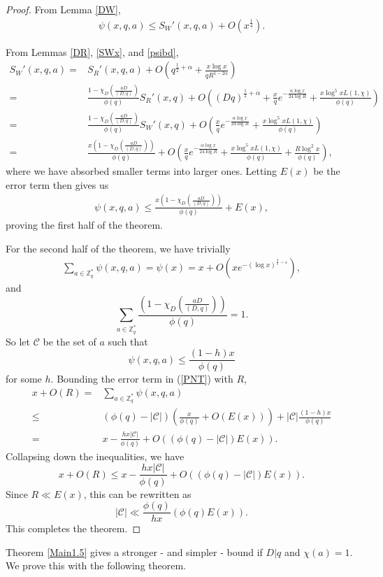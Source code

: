 \documentclass{amsart}
\begin{document}
\begin{proof}
From Lemma \ref{DW},
\begin{align*}
\psi(x,q,a)\leq S_W'(x,q,a)+O\left(x^\frac 14\right).
\end{align*}

From Lemmas \ref{DR}, \ref{SWx}, and \ref{psibd},
\begin{align*}
S_W'(x,q,a)=&S_R'(x,q,a)+O\left(q^{\frac 12+\alpha}+\frac{x\log x}{qR^{1-2\alpha}}\right)\\
=&\frac{1-\chi_D\left(\frac{aD}{(D,q)}\right)}{\phi(q)}S_R'(x,q)+O\left((Dq)^{\frac 12+\alpha}+\frac xqe^{-\frac{\alpha\log x}{24\log R}}+\frac{x\log^5 xL(1,\chi)}{\phi(q)}\right)\\
=&\frac{1-\chi_D\left(\frac{aD}{(D,q)}\right)}{\phi(q)}S_W'(x,q)+O\left(\frac xqe^{-\frac{\alpha\log x}{24\log R}}+\frac{x\log^5 xL(1,\chi)}{\phi(q)}\right)\\
=&\frac{x\left(1-\chi_D\left(\frac{aD}{(D,q)}\right)\right)}{\phi(q)}+O\left(\frac xqe^{-\frac{\alpha\log x}{24\log R}}+\frac{x\log^5 xL(1,\chi)}{\phi(q)}+\frac{R\log^2 x}{\phi(q)}\right),
\end{align*}
where we have absorbed smaller terms into larger ones.  Letting $E(x)$ be the error term then gives us
\begin{gather}\label{psibd1} \psi(x,q,a)\leq \frac{x\left(1-\chi_D\left(\frac{aD}{(D,q)}\right)\right)}{\phi(q)}+E(x),\end{gather}
proving the first half of the theorem.

For the second half of the theorem, we have trivially
\begin{gather}\label{PNT}
\sum_{a\in \mathbb Z_q^*}\psi(x,q,a)=\psi(x)=x+O\left(xe^{-(\log x)^{\frac 35-\varepsilon}}\right),
\end{gather}
and
$$\sum_{a\in \mathbb Z_q^*}\frac{\left(1-\chi_D\left(\frac{aD}{(D,q)}\right)\right)}{\phi(q)}=1.$$
So let $\mathcal C$ be the set of $a$ such that
$$\psi(x,q,a)\leq \frac{(1-h)x}{\phi(q)}$$
for some $h$.  Bounding the error term in (\ref{PNT}) with $R$,
\begin{align*}x+O\left(R\right)=&\sum_{a\in \mathbb Z_q^*}\psi(x,q,a)\\
\leq &(\phi(q)-|\mathcal C|)\left(\frac{x}{\phi(q)}+O\left(E(x)\right)\right)+|\mathcal C|\frac{(1-h)x}{\phi(q)}\\
=& x-\frac{hx|\mathcal C|}{\phi(q)}+O\left((\phi(q)-|\mathcal C|)E(x)\right).
\end{align*}
Collapsing down the inequalities, we have
$$x+O\left(R\right)\leq x-\frac{hx|\mathcal C|}{\phi(q)}+O\left((\phi(q)-|\mathcal C|)E(x)\right).$$
Since $R\ll E(x)$, this can be rewritten as
$$|\mathcal C|\ll \frac{\phi(q)}{hx}\left(\phi(q)E(x)\right).$$
This completes the theorem.
\end{proof}
Theorem \ref{Main1.5} gives a stronger - and simpler - bound if $D|q$ and $\chi(a)=1$.  We prove this with the following theorem.
\end{document}
